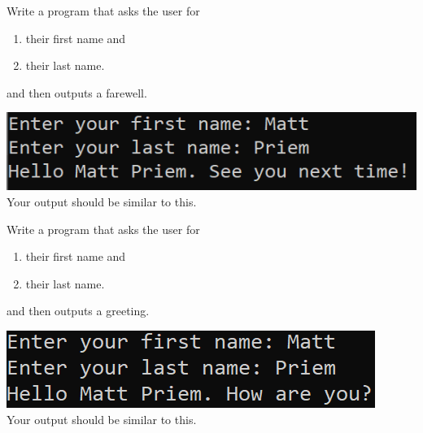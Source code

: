 	\item 
		Write a program that asks the user for \\
		\begin{minipage}{0.5\textwidth}
		\vspace*{-0.5em}
			\begin{enumerate}  \setlength\itemsep{-0.3em}
				\item their first name and
				\item their last name.  
			\end{enumerate} \vspace*{-1ex}
		and then outputs a farewell.
		\end{minipage}
		\begin{minipage}{0.5\textwidth}
			\centering
			\includegraphics[scale=0.9]{./imgs/outputFarewell.png}\\
			Your output should be similar to this.
		\end{minipage}



	\item 
		Write a program that asks the user for \\
		\begin{minipage}{0.5\textwidth}
		\vspace*{-0.5em}
			\begin{enumerate}  \setlength\itemsep{-0.3em}
				\item their first name and
				\item their last name.  
			\end{enumerate} \vspace*{-1ex}
		and then outputs a greeting.
		\end{minipage}
		\begin{minipage}{0.5\textwidth}
			\centering
			\includegraphics[scale=0.9]{./imgs/outputGreeting.png}\\
			Your output should be similar to this.
		\end{minipage}




